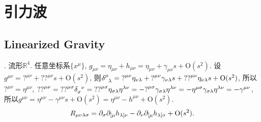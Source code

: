 \chapter{引力波}\label{GW}

\section{Linearized Gravity}

\cite{Wald1984}. 流形$\mathbb{R}^{4}$. 任意坐标系$\{x^{\mu}\}$, $g_{\mu\nu}=\eta_{\mu\nu}+h_{\mu\nu}=\eta_{\mu\nu}+\gamma_{\mu\nu}s+\text{O}(s^2)$. 设$g^{\mu\nu}={?}^{\mu\nu}+{??}^{\mu\nu}s+\text{O}(s^2)$, 则$\delta^{\mu}_{\ph{\mu}\lambda}={?}^{\mu\nu}\eta_{\nu\lambda}+{?}^{\mu\nu}\gamma_{\nu\lambda}s+{??}^{\mu\nu}\eta_{\nu\lambda}s+\text{O}(s^2)$, 所以${?}^{\mu\nu}=\eta^{\mu\nu}$, ${??}^{\mu\nu}={??}^{\mu\sigma}\delta_{\sigma}^{\ph{\sigma}\nu}={??}^{\mu\sigma}\eta_{\sigma\lambda}\eta^{\lambda\nu}=-{?}^{\mu\sigma}\gamma_{\sigma\lambda}\eta^{\lambda\nu}=-\eta^{\mu\sigma}\gamma_{\sigma\lambda}\eta^{\lambda\nu}=-\gamma^{\mu\nu}$, 所以$g^{\mu\nu}=\eta^{\mu\nu}-\gamma^{\mu\nu}s+\text{O}(s^2)=\eta^{\mu\nu}-h^{\mu\nu}+\text{O}(s^2)$.
\begin{equation}
    R_{\mu\nu\lambda\sigma}=\partial_\sigma\partial_{[\mu}h_{\lambda]\nu}-\partial_\nu\partial_{[\mu}h_{\lambda]\sigma}+\text{O}(s^2).
\end{equation}

